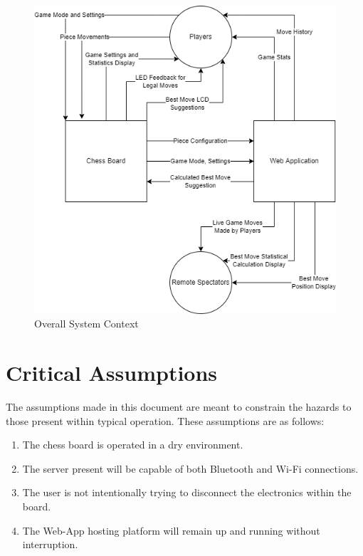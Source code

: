 \documentclass{article}
\begin{document}
{    \begin{figure}[H]
        \begin{center}
          \includegraphics[scale=0.65]{chess-connect-system-context.png}
          \caption{Overall System Context}
          \label{Fig_SystemContext} 
        \end{center}
      \end{figure}
}

\section{Critical Assumptions}

The assumptions made in this document are meant to constrain the hazards to those present within typical operation. These assumptions are as follows:
\begin{enumerate}
    \item The chess board is operated in a dry environment.
    \item The server present will be capable of both Bluetooth and Wi-Fi connections.
    \item The user is not intentionally trying to disconnect the electronics within the board.
    \item The Web-App hosting platform will remain up and running without interruption.
\end{enumerate}
\end{document}

